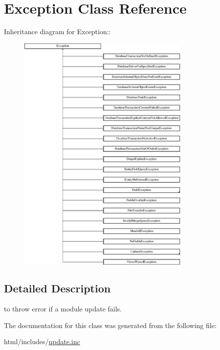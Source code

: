 \hypertarget{classException}{
\section{Exception Class Reference}
\label{classException}
}
Inheritance diagram for Exception::\begin{figure}[H]
\begin{center}
\leavevmode
\includegraphics[height=12cm]{classException}
\end{center}
\end{figure}


\subsection{Detailed Description}
to throw error if a module update fails. 

The documentation for this class was generated from the following file:\begin{DoxyCompactItemize}
\item 
html/includes/\hyperlink{update_8inc}{update.inc}\end{DoxyCompactItemize}
